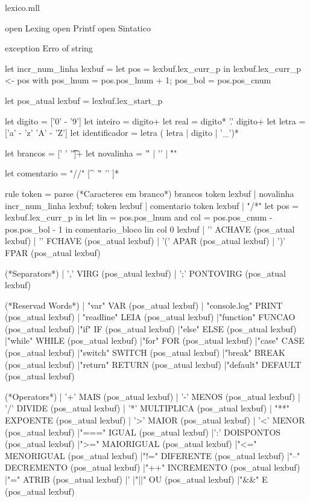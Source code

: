 \documentclass[12pt,a4paper,twoside]{article}
\begin{document}
lexico.mll
\begin{terminal}
{
  open Lexing
  open Printf
  open Sintatico

  exception Erro of string

  let incr_num_linha lexbuf =
    let pos = lexbuf.lex_curr_p in
    lexbuf.lex_curr_p <-
      { pos with pos_lnum = pos.pos_lnum + 1;
                 pos_bol = pos.pos_cnum
      }

  let pos_atual lexbuf = lexbuf.lex_start_p

}

let digito = ['0' - '9']
let inteiro = digito+
let real = digito* '.' digito+
let letra = ['a' - 'z' 'A' - 'Z']
let identificador = letra ( letra | digito | '_')*

let brancos = [' ' '\t']+
let novalinha = '\r' | '\n' | "\r\n"

let comentario = "//" [^ '\r' '\n' ]*

rule token =
  parse
	(*Caracteres em branco*)
	brancos { token lexbuf }
	| novalinha { incr_num_linha lexbuf; token lexbuf }
	| comentario { token lexbuf }
	| "/*"			{	let pos = lexbuf.lex_curr_p in
						let lin = pos.pos_lnum
						and col = pos.pos_cnum - pos.pos_bol - 1 in
						comentario_bloco lin col 0 lexbuf 
					}
	| '{'			{ACHAVE (pos_atual lexbuf) }
	| '}'			{FCHAVE (pos_atual lexbuf) }
	| '('			{ APAR (pos_atual lexbuf) }
	| ')'			{ FPAR (pos_atual lexbuf) }

	(*Separators*)
	| ','			{ VIRG (pos_atual lexbuf) }
	| ';'			{ PONTOVIRG (pos_atual lexbuf) }

	(*Reservad Words*)
	| "var"			{ VAR (pos_atual lexbuf) }
	| "console.log" 	{ PRINT (pos_atual lexbuf) }
	| "readline"	{ LEIA (pos_atual lexbuf) }
	|"function" { FUNCAO (pos_atual lexbuf) }
	|"if"				{ IF (pos_atual lexbuf) }
	|"else"			{ ELSE (pos_atual lexbuf) }
	|"while"		{ WHILE (pos_atual lexbuf) }
	|"for"			{ FOR (pos_atual lexbuf) }
	|"case"			{ CASE (pos_atual lexbuf) }
	|"switch"		{ SWITCH (pos_atual lexbuf) }
	|"break"		{ BREAK (pos_atual lexbuf) }
	|"return"		{ RETURN  (pos_atual lexbuf) }
	|"default"		{ DEFAULT (pos_atual lexbuf) }


	(*Operators*)
	| '+'			{ MAIS  (pos_atual lexbuf) }
	| '-'			{ MENOS  (pos_atual lexbuf) }
	| '/'			{ DIVIDE  (pos_atual lexbuf) }
	| '*'			{ MULTIPLICA (pos_atual lexbuf) }
	| "**"		{ EXPOENTE (pos_atual lexbuf) }
	| '>'			{ MAIOR (pos_atual lexbuf) }
	| '<'			{ MENOR (pos_atual lexbuf) }
	|"==="			{ IGUAL (pos_atual lexbuf) }
	|':'			{ DOISPONTOS (pos_atual lexbuf) }
	|">="			{ MAIORIGUAL (pos_atual lexbuf) }
	|"<="			{ MENORIGUAL (pos_atual lexbuf) }
	|"!="			{ DIFERENTE (pos_atual lexbuf) }
	|"--"			{ DECREMENTO (pos_atual lexbuf) }	
	|"++"			{ INCREMENTO (pos_atual lexbuf) }	
	|"="			{ ATRIB (pos_atual lexbuf) }
	|'%
	|"||"			{ OU (pos_atual lexbuf) }
	|"&&"			{ E (pos_atual lexbuf) }


\end{terminal}
\end{document}
